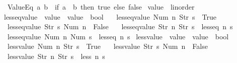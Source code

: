 \begin{isabellebody}
\ \ {\isachardoublequoteopen}ValueEq\ a\ b\ {\isasymequiv}\ {\isacharparenleft}if\ a\ {\isacharequal}\ b\ then\ true\ else\ false{\isacharparenright}{\isachardoublequoteclose}\isanewline
\isanewline
{}\isamarkupfalse%
\ {\isachardoublequoteopen}value{\isachardoublequoteclose}\ {\isacharcolon}{\isacharcolon}\ linorder\ \isanewline
{}\isamarkupfalse%
\ less{\isacharunderscore}eq{\isacharunderscore}value\ {\isacharcolon}{\isacharcolon}\ {\isachardoublequoteopen}value\ {\isasymRightarrow}\ value\ {\isasymRightarrow}\ bool{\isachardoublequoteclose}\ \isanewline
\ \ {\isachardoublequoteopen}less{\isacharunderscore}eq{\isacharunderscore}value\ {\isacharparenleft}Num\ n{\isacharparenright}\ {\isacharparenleft}Str\ s{\isacharparenright}\ {\isacharequal}\ True{\isachardoublequoteclose}\ {\isacharbar}\isanewline
\ \ {\isachardoublequoteopen}less{\isacharunderscore}eq{\isacharunderscore}value\ {\isacharparenleft}Str\ s{\isacharparenright}\ {\isacharparenleft}Num\ n{\isacharparenright}\ {\isacharequal}\ False{\isachardoublequoteclose}\ {\isacharbar}\isanewline
\ \ {\isachardoublequoteopen}less{\isacharunderscore}eq{\isacharunderscore}value\ {\isacharparenleft}Str\ n{\isacharparenright}\ {\isacharparenleft}Str\ s{\isacharparenright}\ {\isacharequal}\ less{\isacharunderscore}eq\ n\ s{\isachardoublequoteclose}\ {\isacharbar}\isanewline
\ \ {\isachardoublequoteopen}less{\isacharunderscore}eq{\isacharunderscore}value\ {\isacharparenleft}Num\ n{\isacharparenright}\ {\isacharparenleft}Num\ s{\isacharparenright}\ {\isacharequal}\ less{\isacharunderscore}eq\ n\ s{\isachardoublequoteclose}\isanewline
\isanewline
{}\isamarkupfalse%
\ less{\isacharunderscore}value\ {\isacharcolon}{\isacharcolon}\ {\isachardoublequoteopen}value\ {\isasymRightarrow}\ value\ {\isasymRightarrow}\ bool{\isachardoublequoteclose}\ \isanewline
\ \ {\isachardoublequoteopen}less{\isacharunderscore}value\ {\isacharparenleft}Num\ n{\isacharparenright}\ {\isacharparenleft}Str\ s{\isacharparenright}\ {\isacharequal}\ True{\isachardoublequoteclose}\ {\isacharbar}\isanewline
\ \ {\isachardoublequoteopen}less{\isacharunderscore}value\ {\isacharparenleft}Str\ s{\isacharparenright}\ {\isacharparenleft}Num\ n{\isacharparenright}\ {\isacharequal}\ False{\isachardoublequoteclose}\ {\isacharbar}\isanewline
\ \ {\isachardoublequoteopen}less{\isacharunderscore}value\ {\isacharparenleft}Str\ n{\isacharparenright}\ {\isacharparenleft}Str\ s{\isacharparenright}\ {\isacharequal}\ less\ n\ s{\isachardoublequoteclose}\ {\isacharbar}\isanewline

\end{isabellebody}
